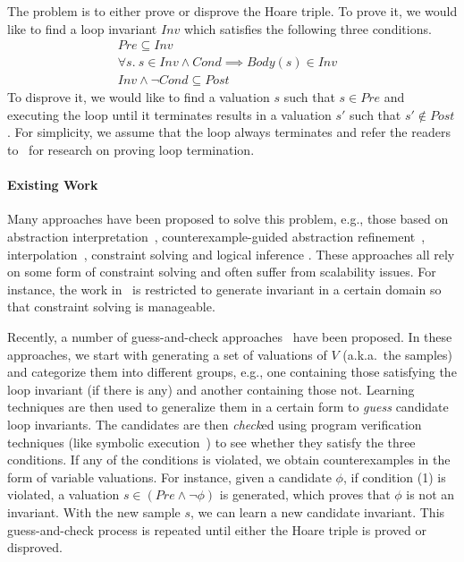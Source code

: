 The problem is to either prove or disprove the Hoare triple. To prove it, we would like to find a loop invariant $\mathit{Inv}$ which satisfies the following three conditions.
\begin{align}
    & Pre \subseteq Inv && \label{inv:pre} \\
    &\forall s.~s \in Inv \land Cond \implies Body(s) \in Inv && \label{inv:loop} \\
    & Inv \land \neg Cond \subseteq Post && \label{inv:post}
\end{align}
To disprove it, we would like to find a valuation $s$ such that $s \in \mathit{Pre}$ and executing the loop until it terminates results in a valuation $s'$ such that $s' \not \in \mathit{Post}$. For simplicity, we assume that the loop always terminates and refer the readers to~\cite{Domagoj:FAC:2013,Hong:ASE:2015} %
for research on proving loop termination.


\paragraph{Existing Work} Many approaches have been proposed to solve this problem, e.g., those based on abstraction interpretation~\cite{cousot1978automatic,mine2006octagon,vincent2009subpolyhedra},
counterexample-guided abstraction refinement~\cite{henzinger2003software,thomas2001slam,edmund2003counterexample}, interpolation~\cite{thomas2004abstractions,kenneth2003interpolation,Kenneth2006lazy}, constraint solving and logical inference \cite{ashutosh2009invgen,michael2003linear,sumit2009constraint,isil2013inductive}. These approaches all rely on some form of constraint solving and often suffer from scalability issues. For instance, the work in~\cite{mine2006octagon,vincent2009subpolyhedra,ashutosh2009invgen} is restricted to generate invariant in a certain domain so that constraint solving is manageable.

Recently, a number of guess-and-check approaches~\cite{sharma2012interpolants,sharma2013verification,DBLP:conf/esop/0001GHALN13,sharma2014invariant} have been proposed.
In these approaches, we start with generating a set of valuations of $V$ (a.k.a.~the samples) and categorize them into different groups, e.g., one containing those satisfying the loop invariant (if there is any) and another containing those not. Learning techniques are then used to generalize them in a certain form to \emph{guess} candidate loop invariants.
The candidates are then \emph{check}ed using program verification techniques (like symbolic execution~\cite{symbolic}) to see whether they satisfy the three conditions. If any of the conditions is violated, we obtain counterexamples in the form of variable valuations.
For instance, given a candidate $\phi$, if condition (1) is violated, a valuation $s \in (Pre \land \neg \phi)$ is generated, which proves that $\phi$ is not an invariant.
With the new sample $s$, we can learn a new candidate invariant. This guess-and-check process is repeated until either the Hoare triple is proved or disproved.

